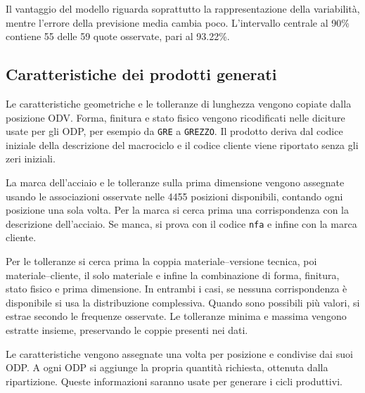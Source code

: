 

\begin{samepage}
Il vantaggio del modello riguarda soprattutto la rappresentazione della variabilità, mentre l'errore della previsione media cambia poco. L'intervallo centrale al 90\% contiene 55 delle 59 quote osservate, pari al \num{93.22}\%.
\par
\end{samepage}

\subsection{Caratteristiche dei prodotti generati}
\label{sec:odp-product-features}

Le caratteristiche geometriche e le tolleranze di lunghezza vengono copiate dalla posizione ODV. Forma, finitura e stato fisico vengono ricodificati nelle diciture usate per gli ODP, per esempio da \texttt{GRE} a \texttt{GREZZO}. Il prodotto deriva dal codice iniziale della descrizione del macrociclo e il codice cliente viene riportato senza gli zeri iniziali.

La marca dell'acciaio e le tolleranze sulla prima dimensione vengono assegnate usando le associazioni osservate nelle \num{4455} posizioni disponibili, contando ogni posizione una sola volta. Per la marca si cerca prima una corrispondenza con la descrizione dell'acciaio. Se manca, si prova con il codice \texttt{nfa} e infine con la marca cliente.

Per le tolleranze si cerca prima la coppia materiale--versione tecnica, poi materiale--cliente, il solo materiale e infine la combinazione di forma, finitura, stato fisico e prima dimensione. In entrambi i casi, se nessuna corrispondenza è disponibile si usa la distribuzione complessiva. Quando sono possibili più valori, si estrae secondo le frequenze osservate. Le tolleranze minima e massima vengono estratte insieme, preservando le coppie presenti nei dati.

Le caratteristiche vengono assegnate una volta per posizione e condivise dai suoi ODP. A ogni ODP si aggiunge la propria quantità richiesta, ottenuta dalla ripartizione. Queste informazioni saranno usate per generare i cicli produttivi.

